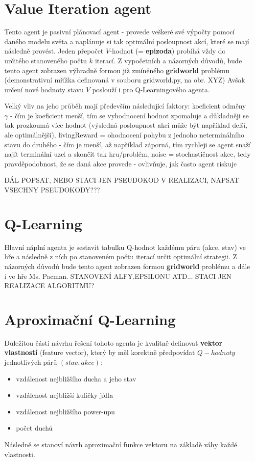 \section{Value Iteration agent}
Tento agent je pasivní plánovací agent - provede veškeré své výpočty pomocí daného modelu světa a naplánuje si tak optimální posloupnost akcí, které se mají následně provést. Jeden přepočet $V$-hodnot (= \textbf{epizoda}) probíhá vždy do určitého stanoveného počtu $k$ iterací.
Z vypočetních a názorných důvodů, bude tento agent zobrazen výhradně formou již zmíněného \textbf{gridworld} problému (demonstrativní mřížka definovaná v souboru gridworld.py, na obr. XYZ)
Avšak určení nové hodnoty stavu $V$ poslouží i pro Q-Learningového agenta.

Velký vliv na jeho průběh mají především následující faktory:
koeficient odměny $\gamma$ - čím je koeficient menší, tím se vyhodnocení hodnot zpomaluje a důkladněji se tak prozkoumá více hodnot (výsledná posloupnost akcí může být například delší, ale optimálnější),
livingReward = ohodnocení pohybu z jednoho neterminálního stavu do druhého - čím je menší, až například záporná, tím rychleji se agent snaží najít terminální uzel a skončit tak hru/problém,
noise = stochastičnost akce, tedy pravděpodobnost, že se daná akce provede - ovlivňuje, jak často agent riskuje

DÁL POPSAT, NEBO STACI JEN PSEUDOKOD V REALIZACI, NAPSAT VSECHNY PSEUDOKODY???

\section{Q-Learning}
Hlavní náplní agenta je sestavit tabulku Q-hodnot každému páru (akce, stav) ve hře a následně z ních po stanoveném počtu iterací určit optimální strategii. Z názorných důvodů bude tento agent zobrazen formou \textbf{gridworld} problému a dále i ve hře Ms. Pacman.
STANOVENÍ ALFY,EPSILONU ATD...
STACI JEN REALIZACE ALGORITMU?
\section{Aproximační Q-Learning}
Důležitou částí návrhu řešení tohoto agenta je kvalitně definovat \textbf{vektor vlastností} (feature vector), který by měl korektně předpovídat $Q-hodnoty$ jednotlivých párů $(stav,akce)$:
\begin{itemize}
\item vzdálenost nejbližšího ducha a jeho stav
\item vzdálenost nejbližší kuličky jídla
\item vzdálenost nejbližšího power-upu
\item počet duchů
\end{itemize}
Následně se stanoví návrh aproximační funkce vektoru na základě váhy každé vlastnosti.

